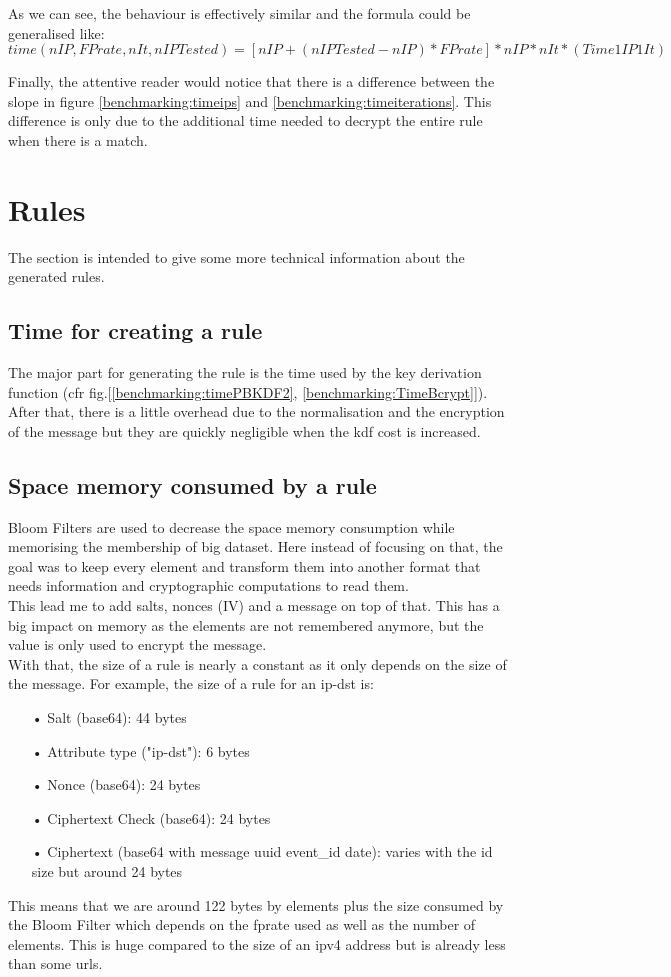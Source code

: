 \documentclass{eplmastersthesis}
\begin{document}
As we can see, the behaviour is effectively similar and the formula could be generalised like:
$$time(nIP, FPrate, nIt, nIPTested)=\left[nIP+(nIPTested-nIP)*FPrate\right]*nIP*nIt*(Time1IP1It)$$

Finally, the attentive reader would notice that there is a difference between the slope in figure \ref{benchmarking:timeips} and \ref{benchmarking:timeiterations}. This difference is only due to the additional time needed to decrypt the entire rule when there is a match.

\section{Rules}

The section is intended to give some more technical information about the generated rules.

\subsection{Time for creating a rule}
The major part for generating the rule is the time used by the key derivation function (cfr fig.[\ref{benchmarking:timePBKDF2}, \ref{benchmarking:TimeBcrypt}]). After that, there is a little overhead due to the normalisation and the encryption of the message but they are quickly negligible when the \gls{kdf} cost is increased.\\

\subsection{Space memory consumed by a rule}
Bloom Filters are used to decrease the space memory consumption while memorising the membership of big dataset. Here instead of focusing on that, the goal was to keep every element and transform them into another format that needs information and cryptographic computations to read them.\\

This lead me to add salts, nonces (IV) and a message on top of that. This has a big impact on memory as the elements are not remembered anymore, but the value is only used to encrypt the message.\\

With that, the size of a rule is nearly a constant as it only depends on the size of the message. For example, the size of a rule for an ip-dst is:
\begin{itemize}
\item[•] Salt (base64): 44 bytes
\item[•] Attribute type ("ip-dst"): 6 bytes
\item[•] Nonce (base64): 24 bytes
\item[•] Ciphertext Check (base64): 24 bytes
\item[•] Ciphertext (base64 with message uuid event\_id date): varies with the id size but around 24 bytes
\end{itemize}
This means that we are around 122 bytes by elements plus the size consumed by the Bloom Filter which depends on the \gls{fp}rate used as well as the number of elements. This is huge compared to the size of an \gls{ipv4} address but is already less than some \glspl{url}.
\end{document}

